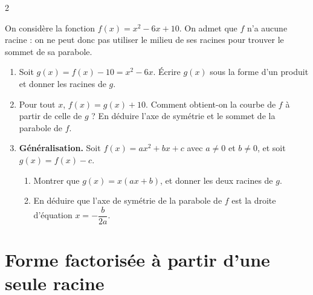 \documentclass[10pt,a4paper]{article}
\begin{document}
\begin{multicols}{2}
\begin{exo}
On considère la fonction \(f(x)=x^2-6x+10\). On admet que \(f\) n'a aucune racine : on ne peut donc pas utiliser le milieu de ses racines pour trouver le sommet de sa parabole.
\begin{enumerate}[leftmargin=*]
    \item Soit \(g(x)=f(x)-10=x^2-6x\). Écrire \(g(x)\) sous la forme d'un produit et donner les racines de \(g\).
    \item Pour tout \(x\), \(f(x)=g(x)+10\). Comment obtient-on la courbe de \(f\) à partir de celle de \(g\) ? En déduire l'axe de symétrie et le sommet de la parabole de \(f\).
    \item \textbf{Généralisation.} Soit \(f(x)=ax^2+bx+c\) avec \(a\neq0\) et \(b\neq0\), et soit \(g(x)=f(x)-c\).
    \begin{enumerate}
        \item Montrer que \(g(x)=x(ax+b)\), et donner les deux racines de \(g\).
        \item En déduire que l'axe de symétrie de la parabole de \(f\) est la droite d'équation \(x=-\dfrac{b}{2a}\).
    \end{enumerate}
\end{enumerate}
\end{exo}


\section{Forme factorisée à partir d'une seule racine}
\label{sec:oneroot}


\end{multicols}
\end{document}
